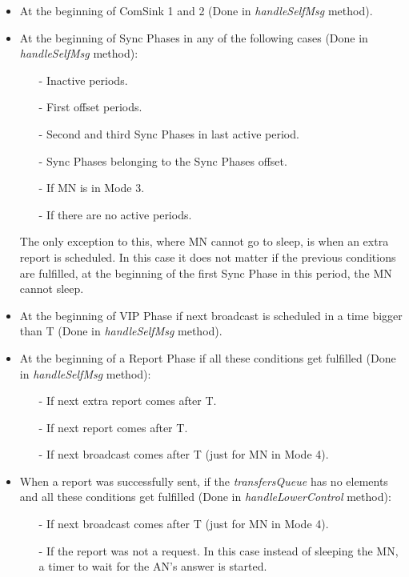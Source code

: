 \begin{itemize}
 \item At the beginning of ComSink 1 and 2 (Done in \textit{handleSelfMsg} method).
 
 \item At the beginning of Sync Phases in any of the following cases (Done in \textit{handleSelfMsg} method):
    \begin{itemize}
      \item[-] Inactive periods.
      \item[-] First offset periods.
      \item[-] Second and third Sync Phases in last active period.
      \item[-] Sync Phases belonging to the Sync Phases offset.
      \item[-] If \ac{MN} is in Mode 3.
      \item[-] If there are no active periods.
    \end{itemize}
  The only exception to this, where \ac{MN} cannot go to sleep, is when an extra report is scheduled. In this case it does not matter if the 
  previous conditions are fulfilled, at the beginning of the first Sync Phase in this period, the \ac{MN} cannot sleep.

 \item At the beginning of \ac{VIP} Phase if next broadcast is scheduled in a time bigger than T (Done in \textit{handleSelfMsg} method).

 \item At the beginning of a Report Phase if all these conditions get fulfilled (Done in \textit{handleSelfMsg} method):
    \begin{itemize}
      \item[-] If next extra report comes after T.
      \item[-] If next report comes after T.
      \item[-] If next broadcast comes after T (just for \ac{MN} in Mode 4).
    \end{itemize}

  \item When a report was successfully sent, if the \textit{transfersQueue} has no elements and all these conditions get fulfilled (Done in 
  \textit{handleLowerControl} method):
    \begin{itemize}
      \item[-] If next broadcast comes after T (just for \ac{MN} in Mode 4).
      \item[-] If the report was not a request. In this case instead of sleeping the \ac{MN}, a timer to wait for the \ac{AN}'s answer is started.
    \end{itemize}


\end{itemize}
